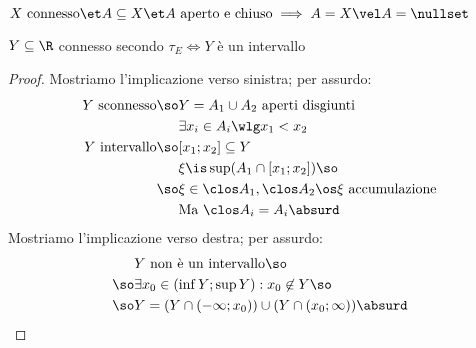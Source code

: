 \begin{prop}
$X\text{ connesso}\et A\subseteq X\et A\text{ aperto e chiuso}\implies A=X\vel A=\nullset$
\end{prop}

\begin{prop}
$Y\subseteq\R$ connesso secondo $\tau_E\iff Y$ è un intervallo
\end{prop}
\begin{proof}
Mostriamo l'implicazione verso sinistra; per assurdo:
\begin{align*}
Y\text{ sconnesso}\so&Y=A_1\cup A_2\text{ aperti disgiunti}\\
&\exists x_i\in A_i\wlg x_1<x_2\\
Y\text{ intervallo}\so&[x_1;x_2]\subseteq Y\\
&\xi\is\sup(A_1\cap[x_1;x_2])\so\\
\so&\xi\in\clos A_1,\clos A_2\os\xi\text{ accumulazione}\\
&\text{Ma }\clos A_i=A_i\absurd
\end{align*}
Mostriamo l'implicazione verso destra; per assurdo:
\begin{align*}
&Y\text{ non è un intervallo}\so\\
\so&\exists x_0\in(\inf Y;\sup Y):x_0\not\in Y\so\\
\so&Y=(Y\cap(-\infty;x_0))\cup(Y\cap(x_0;\infty))\absurd \qedhere
\end{align*}
\end{proof}
